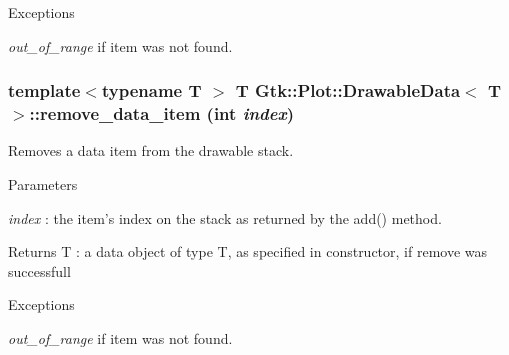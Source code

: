 \begin{DoxyExceptions}{Exceptions}
\item[{\em out\_\-of\_\-range}]if item was not found. \end{DoxyExceptions}
\hypertarget{classGtk_1_1Plot_1_1DrawableData_a94163585f0c15cdd71e293c19bcaecc4}{
\subsubsection[{remove\_\-data\_\-item}]{\setlength{\rightskip}{0pt plus 5cm}template$<$typename T $>$ T {\bf Gtk::Plot::DrawableData}$<$ T $>$::remove\_\-data\_\-item (int {\em index})}}
\label{classGtk_1_1Plot_1_1DrawableData_a94163585f0c15cdd71e293c19bcaecc4}


Removes a data item from the drawable stack. 
\begin{DoxyParams}{Parameters}
\item[{\em index}]: the item's index on the stack as returned by the add() method. \end{DoxyParams}
\begin{DoxyReturn}{Returns}
T : a data object of type T, as specified in constructor, if remove was successfull 
\end{DoxyReturn}

\begin{DoxyExceptions}{Exceptions}
\item[{\em out\_\-of\_\-range}]if item was not found. \end{DoxyExceptions}


